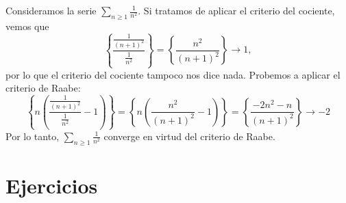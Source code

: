 \begin{ejemplo}
    Consideramos la serie $\displaystyle\sum_{n \geq 1} \frac{1}{n^2}$.
    Si tratamos de aplicar el criterio del cociente, vemos que
    \begin{equation*}
        \left\{ \frac{\frac{1}{(n+1)^2}}{\frac{1}{n^2}} \right\} = \left\{ \frac{n^2}{(n+1)^2} \right\} \longrightarrow 1,
    \end{equation*}
    por lo que el criterio del cociente tampoco nos dice nada. Probemos a aplicar el criterio de Raabe:
    \begin{equation*}
        \left\{ n \left(\frac{\frac{1}{(n+1)^2}}{\frac{1}{n^2}} -1\right) \right\} = \left\{ n\left(\frac{n^2}{(n+1)^2}-1\right) \right\} = \left\{ \frac{-2n^2-n}{(n+1)^2} \right\} \longrightarrow -2
    \end{equation*}
    Por lo tanto, $\displaystyle\sum_{n \geq 1} \frac{1}{n^2}$ converge en virtud del criterio de Raabe.
\end{ejemplo}


\section{Ejercicios}

\renewcommand{\theenumi}{\alph{enumi}} %

